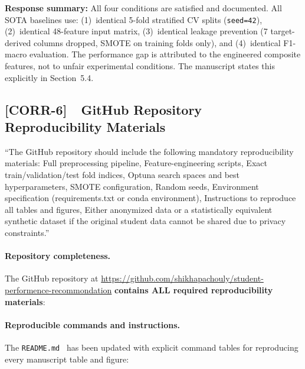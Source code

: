 \documentclass[11pt,a4paper]{article}
\newcommand{\cid}[1]{\textcolor{revred}{\textbf{[#1]}}}
\newcommand{\filebox}[1]{\texttt{\small #1}}
\newcommand{\sectref}[1]{Section~#1}
\newcommand{\stress}[1]{\textbf{#1}}
\begin{document}
\begin{correctionbox}
\noindent \textbf{Response summary:} All four conditions are  satisfied and documented. All SOTA baselines use: (1)~identical 5-fold stratified CV splits (\texttt{seed=42}), (2)~identical 48-feature input matrix, (3)~identical leakage prevention (7 target-derived columns dropped, SMOTE on training folds only), and (4)~identical F1-macro evaluation. The performance gap is attributed to the engineered composite features, not to unfair experimental conditions. The manuscript  states this explicitly in \sectref{5.4}.
\end{correctionbox}


\subsection*{\cid{CORR-6}~~GitHub Repository Reproducibility Materials}

\begin{reviewerquote}
``The GitHub repository should include the following mandatory reproducibility materials: Full preprocessing pipeline, Feature-engineering scripts, Exact train/validation/test fold indices, Optuna search spaces and best hyperparameters, SMOTE configuration, Random seeds, Environment specification (requirements.txt or conda environment), Instructions to reproduce all tables and figures, Either anonymized data or a statistically equivalent synthetic dataset if the original student data cannot be shared due to privacy constraints.''
\end{reviewerquote}

\paragraph{Repository completeness.} The GitHub repository at \url{https://github.com/shikhapachouly/student-performence-recommondation} \stress{ contains ALL required reproducibility materials}:

\paragraph{Reproducible commands and instructions.} The \filebox{README.md } has been updated with explicit command tables for reproducing every manuscript table and figure:
\end{document}

